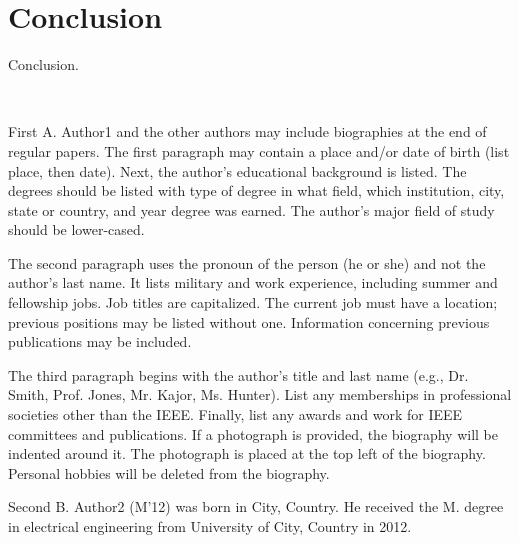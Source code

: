 \documentclass[journal]{IEEEtranTIE}
\begin{document}
\section{Conclusion}

Conclusion.



\ %

{\color{red}

\vspace{-1cm}
\begin{IEEEbiography}
{First A. Author1} and the other authors may include biographies at the end of regular papers. The first paragraph may contain a place and/or date of birth (list place, then date). Next, the author's educational background is listed. The degrees should be listed with type of degree in what field, which institution, city, state or country, and year degree was earned. The author's major field of study should be lower-cased.

The second paragraph uses the pronoun of the person (he or she) and not the author's last name. It lists military and work experience, including summer and fellowship jobs. Job titles are capitalized. The current job must have a location; previous positions may be listed without one. Information concerning previous publications may be included.

The third paragraph begins with the author's title and last name (e.g., Dr. Smith, Prof. Jones, Mr. Kajor, Ms. Hunter). List any memberships in professional societies other than the IEEE. Finally, list any awards and work for IEEE committees and publications. If a photograph is provided, the biography will be indented around it. The photograph is placed at the top left of the biography. Personal hobbies will be deleted from the biography.
\end{IEEEbiography}

\vspace{-2cm}
\begin{IEEEbiography}
{Second B. Author2} (M'12) was born in City, Country. He received the M. degree in electrical engineering from University of City, Country in 2012.


\end{IEEEbiography}}
\end{document}
